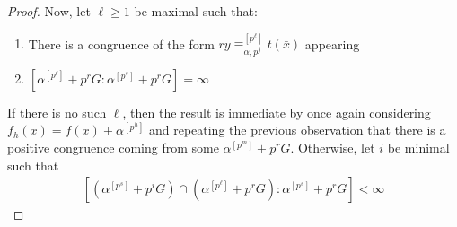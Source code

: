 \documentclass[a4paper,11pt]{article}
\newcommand{\nl}{\newline}
\begin{document}
\begin{proof}
    \nl\nl
	Now, let $\ell\geq 1$ be maximal such that:
	\begin{enumerate}[(1)]
		\item There is a congruence of the form $ry\equiv_{\alpha,{p^j}}^{[p^\ell]} t(\bar x)$ appearing
		\item $[\alpha^{[p^\ell]}+p^rG:\alpha^{[p^s]}+p^rG] = \infty$
	\end{enumerate}
    If there is no such $\ell$, then the result is immediate by once again considering $f_h(x) = f(x) + \alpha^{[p^h]}$ and repeating the previous observation that there is a positive congruence coming from some $\alpha^{[p^m]}+p^rG$.
	\nl\nl
	Otherwise, let $i$ be minimal such that 
    \begin{align*}
        \left[(\alpha^{[p^s]}+p^iG)\cap(\alpha^{[p^\ell]} + p^r G): \alpha^{[p^s]}+p^rG\right] <\infty
    \end{align*}
    

\end{proof}
\end{document}
